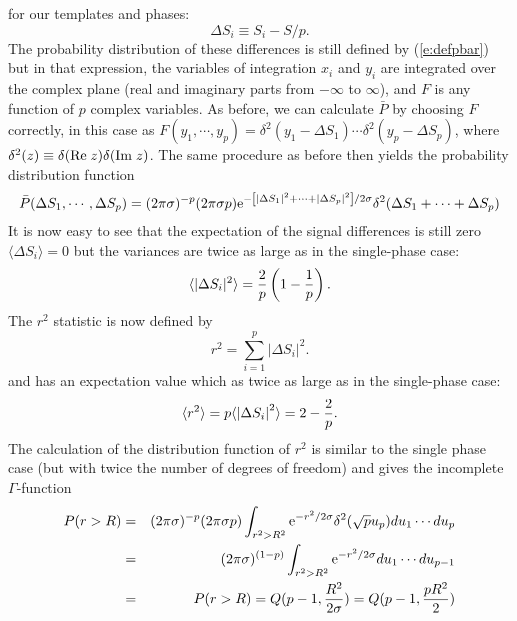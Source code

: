 for our templates and phases:
\begin{equation}
\Delta S_i \equiv S_i-S/p.
\end{equation}
The probability distribution of these differences is still defined by
(\ref{e:defpbar}) but in that expression, the variables of integration
$x_i$ and $y_i$ are integrated over the complex plane (real and imaginary
parts from $-\infty$ to $\infty$), and $F$ is any function of $p$
complex variables.  As before, we can calculate $\bar P$ by choosing $F$
correctly, in this case as $F(y_1,\cdots,y_p) = \delta^2(y_1 - \Delta S_1)
\cdots \delta^2(y_p - \Delta S_p)$, where $\delta^2(z) \equiv \delta({\rm
Re} \; z)  \delta({\rm Im} \; z)$.
The same procedure as before then yields the probability distribution function
\begin{equation}
\bar P (\Delta S_1,\cdots,\Delta S_p) =
(2 \pi \sigma)^{-p} (2 \pi \sigma p) {\rm e}^{-\left[ |\Delta S_1|^2 + \cdots + |\Delta S_p|^2 \right] /2 \sigma}
\delta^2(\Delta S_1 + \cdots +\Delta S_p)
\end{equation}
It is now easy to see that the expectation of the signal differences is still zero
$\langle \Delta S_i \rangle = 0$ but the variances are twice as large as in
the single-phase case:
\begin{equation}
\langle |\Delta S_i|^2 \rangle = {2 \over p}\left( 1 - {1 \over p} \right).
\end{equation}
The $r^2$ statistic is now defined by
\begin{equation}
\label{e:deftwhophaser2}
r^2 = \sum_{i=1}^p \left| \Delta S_i \right| ^2.
\end{equation}
and has an expectation value which as twice as large as in the single-phase case:
\begin{equation}
\label{r2expected}
\langle r^2 \rangle = p \langle \left| \Delta  S_i \right|^2 \rangle = 2 - {2 \over p}.
\end{equation}
The calculation of the distribution function of $r^2$ is similar to the
single phase case (but with twice the number of degrees of freedom) and gives
the incomplete $\Gamma$-function
\begin{eqnarray}
\nonumber
P(r>R) &=& (2 \pi \sigma)^{-p} (2 \pi \sigma p) \int_{r^2 > R^2} 
     {\rm e}^{-r^2/2\sigma} \delta^2(\sqrt{p} u_p) du_1 \cdots du_p\\
\nonumber
 & = & 
 (2 \pi \sigma)^{(1-p)}  \int_{r^2 > R^2} 
     {\rm e}^{-r^2/2\sigma}  du_1 \cdots du_{p-1} \\
& = &
    P(r>R) = Q(  { p-1}  ,{ R^2 \over 2 \sigma}) = Q(  { p-1}  ,{ p R^2 \over 2})
\end{eqnarray}
